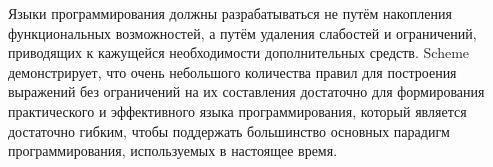 
\label{historysection}

Языки программирования должны разрабатываться не путём накопления функциональных
возможностей, а путём удаления слабостей и ограничений, приводящих к кажущейся
необходимости дополнительных средств. Scheme демонстрирует, что очень небольшого количества правил
для построения выражений без ограничений на их составления достаточно
для формирования практического и эффективного языка программирования, который является достаточно
гибким, чтобы поддержать большинство основных парадигм программирования, используемых в настоящее время.


